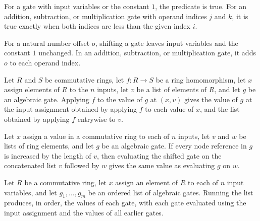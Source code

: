 \begin{definition}
\label{Randomized.AlgGate.refsBelow}
\leanok
{}
For a gate with input variables or the constant $1$, the predicate is true. For an
addition, subtraction, or multiplication gate with operand indices $j$ and $k$, it is
true exactly when both indices are less than the given index $i$.
\end{definition}

\begin{definition}
\label{Randomized.AlgGate.shift}
\leanok
{}
For a natural number offset $o$, shifting a gate leaves input variables and the constant
$1$ unchanged. In an addition, subtraction, or multiplication gate, it adds $o$ to each
operand index.
\end{definition}

\begin{theorem}
\label{Randomized.AlgGate.map_eval}
\leanok
{}
Let $R$ and $S$ be commutative rings, let $f:R\to S$ be a ring homomorphism, let $x$
assign elements of $R$ to the $n$ inputs, let $v$ be a list of elements of $R$, and let
$g$ be an algebraic gate. Applying $f$ to the value of $g$ at $(x,v)$ gives the value of
$g$ at the input assignment obtained by applying $f$ to each value of $x$, and the list
obtained by applying $f$ entrywise to $v$.
\end{theorem}

\begin{theorem}
\label{Randomized.AlgGate.eval_shift}
\leanok
{}
Let $x$ assign a value in a commutative ring to each of $n$ inputs, let $v$ and $w$ be
lists of ring elements, and let $g$ be an algebraic gate. If every node reference in $g$
is increased by the length of $v$, then evaluating the shifted gate on the concatenated
list $v$ followed by $w$ gives the same value as evaluating $g$ on $w$.
\end{theorem}

\begin{definition}
\label{Randomized.AlgCircuit.run}
\leanok
{}
Let $R$ be a commutative ring, let $x$ assign an element of $R$ to each of $n$ input
variables, and let $g_1,\ldots,g_m$ be an ordered list of algebraic gates. Running the
list produces, in order, the values of each gate, with each gate evaluated using the
input assignment and the values of all earlier gates.
\end{definition}

